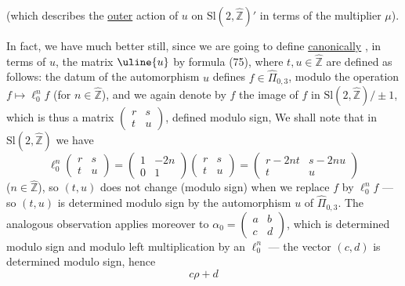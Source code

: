 
(which describes the \uline{outer} action of $u$ on
$\mathrm{Sl}(2,\widehat{\mathbb Z})'$ in terms of the multiplier $\mu$).


In fact, we have much better still,
since we are going to define \uline{canonically}
,
in terms of $u$, the matrix $\uline{u}$ by
formula (75), where  $t,u\in\widehat{\mathbb Z}$ are
defined as follows:  the datum of the automorphism $u$
defines $f\in\widehat{\Pi}_{0,3}$, modulo the operation $f\mapsto\ell_0^n f$
(for $n\in\widehat{\mathbb Z}$), and we again denote by $f$
the image of $f$ in $\mathrm{Sl}(2,\widehat{\mathbb Z})/\pm1$, which is thus
a matrix $\begin{pmatrix}r&s\\t&u\end{pmatrix}$, defined modulo sign,
We shall note that in $\mathrm{Sl}(2,\widehat{\mathbb Z})$ we have
\[
\ell_0^n\begin{pmatrix}r&s\\t&u\end{pmatrix}
=\begin{pmatrix}1&-2n\\0&1\end{pmatrix}
\begin{pmatrix}r&s\\t&u\end{pmatrix}
=\begin{pmatrix}r-2nt&s-2nu\\t&u\end{pmatrix}
\tag{79}
\]
($n\in\widehat{\mathbb Z}$), so $(t,u)$ does not change (modulo sign)
when we replace $f$ by $\ell_0^n f$ --- so $(t,u)$
is determined modulo sign by the automorphism $u$
of $\widehat{\Pi}_{0,3}$.  The analogous observation applies
moreover to $\alpha_0=\begin{pmatrix}a&b\\c&d\end{pmatrix}$, which is determined
modulo sign and modulo left multiplication
by an $\ell_0^n$ --- the  vector $(c,d)$ is
determined modulo sign, hence 
\[
c\rho+d
\]

